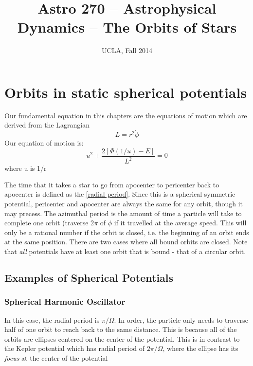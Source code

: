 


\title{Astro 270 -- Astrophysical Dynamics -- The Orbits of Stars}
\author{UCLA, Fall 2014}


\setlength{\unitlength}{1mm}
\maketitle

\section{Orbits in static spherical potentials}
Our fundamental equation in this chapters are the equations of motion which are derived from the Lagrangian
\begin{equation}
L = r^2 \dot{\phi}
\end{equation}
Our equation of motion is:
\begin{equation}
u^2 + \frac{2[\Phi (1/u) - E]}{L^2} = 0
\end{equation}
where u is 1/r

The time that it takes a star to go from apocenter to pericenter back
to apocenter is defined as the \ref{radial period}. Since this is a
spherical symmetric potential, pericenter and apocenter are always the
same for any orbit, though it may precess. The azimuthal period is the
amount of time a particle will take to complete one orbit (traverse
2$\pi$ of $\phi$ if it travelled at the average speed. This will only
be a rational number if the orbit is closed, i.e. the beginning of an
orbit ends at the same position. There are two cases where all bound
orbits are closed. Note that \textit{all} potentials have at least one
orbit that is bound - that of a circular orbit. 
\subsection{Examples of Spherical Potentials}
\subsubsection{Spherical Harmonic Oscillator}
In this case, the radial period is $\pi /\Omega$. In order, the
particle only needs to traverse half of one orbit to reach back to the
same distance. This is because all of the orbits are ellipses centered
on the center of the potential. This is in contrast to the Kepler
potential which has radial period of $2\pi / \Omega$, where the
ellipse has its \textit{focus} at the center of the potential

